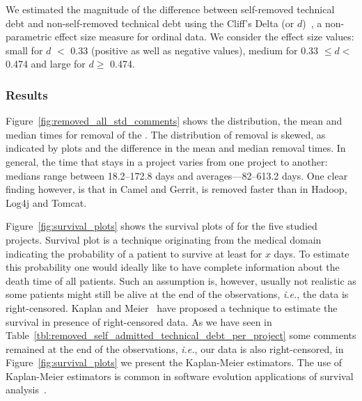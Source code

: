 


We estimated the magnitude of the difference between self-removed technical debt and non-self-removed technical debt using the Cliff's Delta (or $d$)~\cite{grissom2005effect}, a non-parametric effect size measure for ordinal data. We consider the effect size values: small for $d$ $<$ 0.33 (positive as well as negative values), medium for 0.33  $\leq d<$ 0.474 and large for $d \geq$ 0.474.

\subsubsection*{Results} Figure~\ref{fig:removed_all_std_comments} shows the distribution, the mean and median times for removal of the \SATD. The distribution of \SATD removal is skewed, as indicated by plots and the difference in the mean and median removal times. In general, the time that \SATD stays in a project  varies from one project to another: medians range between 18.2--172.8 days and averages---82--613.2 days. One clear finding however, is that in Camel and Gerrit, \SATD is removed faster than in Hadoop, Log4j and Tomcat.

Figure~\ref{fig:survival_plots} shows the survival plots of \SATD for the five studied projects. Survival plot is a technique originating from the medical domain indicating the probability of a patient to survive at least for $x$ days. To estimate this probability one would ideally like to 
have complete information about the death time of all patients. Such an assumption is, however,
usually not realistic as some patients might still be alive at the end of the observations, \emph{i.e.},
the data is right-censored. Kaplan
and Meier~\cite{kaplan1958nonparametric} have proposed a technique to estimate the survival
in presence of right-censored data. As we have seen in Table~\ref{tbl:removed_self_admitted_technical_debt_per_project} some \SATD comments remained at
the end of the observations, \emph{i.e.}, our data is also right-censored, in Figure~\ref{fig:survival_plots}
we present the Kaplan-Meier estimators. The use of Kaplan-Meier estimators is common in 
software evolution applications of survival analysis~\cite{samoladas2010survival,goeminne2015towards,Lin:et:al}.

